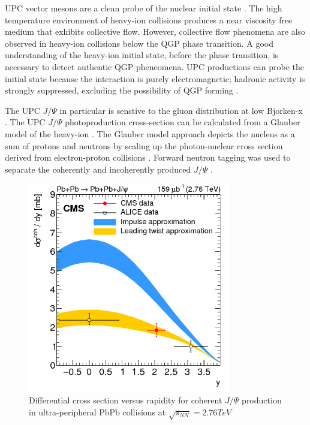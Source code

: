 UPC vector mesons are a clean probe of the nuclear initial state \cite{Aktas:2006qs}\cite{oniaPol}. The high temperature environment of heavy-ion collisions produces a near viscosity free medium that exhibits collective flow. However, collective flow phenomena are also observed in heavy-ion collisions below the QGP phase transition. A good understanding of the heavy-ion initial state, before the phase transition, is necessary to detect authentic QGP pheneomena. UPC productions can probe the initial state because the interaction is purely electromagnetic; hadronic activity is strongly suppressed, excluding the possibility of QGP forming \cite{vmd1999}\cite{vmd2000.03}. 

The UPC $J/\Psi$ in particular is senstive to the gluon distribution at low Bjorken-x \cite{Teubner:2005sj}. The UPC $J/\Psi$ photoproduction cross-section can be calculated from a Glauber model of the heavy-ion \cite{Brodsky:1994kf}. The Glauber model approach depicts the nucleus as a sum of protons and neutrons by scaling up the photon-nuclear cross section derived from electron-proton collisions \cite{Miller:2007ri}. Forward neutron tagging was used to separate the coherently and incoherently produced $J/\Psi$ \cite{Guzey:2013jaa} \cite{Strikman:2005ze} \cite{lta2012.03}\cite{emPcite4}\cite{emPCite5}\cite{emPCite6}\cite{upcNeuPHENIX}.

\begin{figure}[h!]
\begin{centering}
\includegraphics[width=3.5in]{Chapter2/importfigs/patkenny_Figure_002.png}
\par\end{centering}
\caption{Differential cross section versus rapidity for coherent $J/\Psi$ production in ultra-peripheral PbPb collisions at $\sqrt{s_{NN}}=2.76 TeV$ \cite{Khachatryan:2016qhq} \label{fig:pk3}}
\end{figure}

